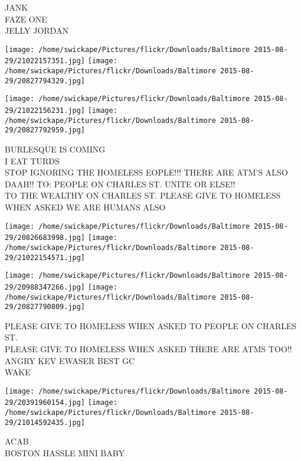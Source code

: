 \documentclass[10pt,letterpaper]{article}
\begin{document}
JANK\\
FAZE ONE\\
JELLY JORDAN\\
\pagebreak

\texttt{[image: /home/swickape/Pictures/flickr/Downloads/Baltimore 2015-08-29/21022157351.jpg]}
\texttt{[image: /home/swickape/Pictures/flickr/Downloads/Baltimore 2015-08-29/20827794329.jpg]}

\texttt{[image: /home/swickape/Pictures/flickr/Downloads/Baltimore 2015-08-29/21022156231.jpg]}
\texttt{[image: /home/swickape/Pictures/flickr/Downloads/Baltimore 2015-08-29/20827792959.jpg]}

BURLESQUE IS COMING\\
I EAT TURDS\\
STOP IGNORING THE HOMELESS EOPLE!!! THERE ARE ATM'S ALSO DAAH!! TO: PEOPLE ON CHARLES ST. UNITE OR ELSE!!\\
TO THE WEALTHY ON CHARLES ST.  PLEASE GIVE TO HOMELESS WHEN ASKED WE ARE HUMANS ALSO\\
\pagebreak

\texttt{[image: /home/swickape/Pictures/flickr/Downloads/Baltimore 2015-08-29/20826683998.jpg]}
\texttt{[image: /home/swickape/Pictures/flickr/Downloads/Baltimore 2015-08-29/21022154571.jpg]}

\texttt{[image: /home/swickape/Pictures/flickr/Downloads/Baltimore 2015-08-29/20988347266.jpg]}
\texttt{[image: /home/swickape/Pictures/flickr/Downloads/Baltimore 2015-08-29/20827790809.jpg]}

PLEASE GIVE TO HOMELESS WHEN ASKED TO PEOPLE ON CHARLES ST.\\
PLEASE GIVE TO HOMELESS WHEN ASKED THERE ARE ATMS TOO!!\\
ANGRY KEV EWASER BEST GC\\
WAKE\\
\pagebreak

\texttt{[image: /home/swickape/Pictures/flickr/Downloads/Baltimore 2015-08-29/20391960154.jpg]}
\texttt{[image: /home/swickape/Pictures/flickr/Downloads/Baltimore 2015-08-29/21014592435.jpg]}

ACAB\\
BOSTON HASSLE MINI BABY\\
\pagebreak
\end{document}
